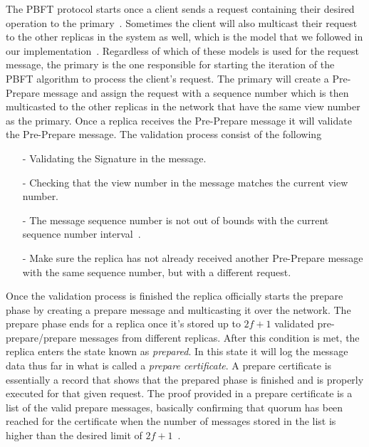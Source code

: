 The PBFT protocol starts once a client sends a request containing their desired operation to the primary~\cite[p.~4]{PAPER:OGPBFT}. Sometimes the client will also multicast their request to the other replicas in the system as well, which is the model that we followed in our implementation~\cites[p.~2]{PAPER:DPBFT}[p.~406]{PAPER:PBFTRecovery}[p.~258]{BOOK:BuildDepDistSyst}. Regardless of which of these models is used for the request message, the primary is the one responsible for starting the iteration of the PBFT algorithm to process the client's request. The primary will create a Pre-Prepare message and assign the request with a sequence number which is then multicasted to the other replicas in the network that have the same view number as the primary. Once a replica receives the Pre-Prepare message it will validate the Pre-Prepare message. The validation process consist of the following~\cites[p.~4]{PAPER:OGPBFT} {SLIDES:PBFT}[p.~259]{BOOK:BuildDepDistSyst}
\begin{itemize}
	\item[-]Validating the Signature in the message.
	\item[-]Checking that the view number in the message matches the current view number.
	\item[-]The message sequence number is not out of bounds with the current sequence number interval~\cites{SLIDES:PBFT}[p.~4]{PAPER:OGPBFT}.
	\item[-]Make sure the replica has not already received another Pre-Prepare message with the same sequence number, but with a different request.
\end{itemize}
Once the validation process is finished the replica officially starts the prepare phase by creating a prepare message and multicasting it over the network. The prepare phase ends for a replica once it's stored up to $2f+1$ validated pre-prepare/prepare messages from different replicas. After this condition is met, the replica enters the state known as \emph{prepared}. In this state it will log the message data thus far in what is called a \emph{prepare certificate}. A prepare certificate is essentially a record that shows that the prepared phase is finished and is properly executed for that given request. The proof provided in a prepare certificate is a list of the valid prepare messages, basically confirming that quorum has been reached for the certificate when the number of messages stored in the list is higher than the desired limit of $2f + 1$~\cites[p.~408]{PAPER:PBFTRecovery}[p.~457]{BOOK:MVstandver3}.
